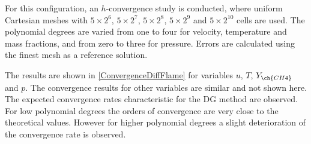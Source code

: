 For this configuration, an $h$-convergence study is conducted, where uniform Cartesian meshes with $5\times2^6$, $5\times2^7$, $5\times2^8$,  $5\times2^9$ and $5\times2^{10}$  cells are used. The polynomial degrees are varied from one to four for velocity, temperature and mass fractions, and from zero to three for pressure.  Errors are calculated using the finest mesh as a reference solution.  

The results are shown in \cref{ConvergenceDiffFlame} for variables $u$, $T$, $Y_{\ch{CH4}}$ and $p$. The convergence results for other variables are similar and not shown here. The expected convergence rates characteristic for the DG method are observed. For low polynomial degrees the orders of convergence are very close to the theoretical values. However for higher polynomial degrees  a slight deterioration of the convergence rate is observed.
